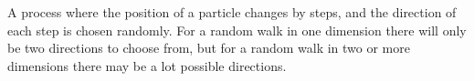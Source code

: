 A process where the position of a particle changes
by steps, and the direction of each step is
chosen randomly. For a random walk in one dimension
there will only be two directions to choose from,
but for a random walk in two or more dimensions
there may be a lot possible directions.